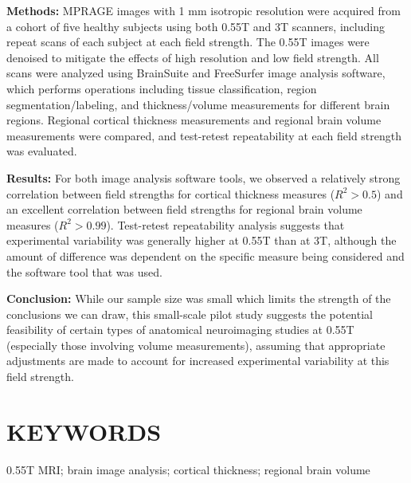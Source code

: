 \documentclass[12pt,letterpaper,onecolumn]{article}
\begin{document}
\noindent \textbf{Methods:} MPRAGE images with 1 mm isotropic resolution were acquired from a cohort of five healthy subjects using both 0.55T and 3T scanners, including repeat scans of each subject at each field strength.  The 0.55T images were denoised to mitigate the effects of high resolution and low field strength.  All scans were analyzed using BrainSuite and FreeSurfer image analysis software, which performs operations including tissue classification, region segmentation/labeling, and thickness/volume measurements for different brain regions. Regional cortical thickness measurements and regional brain volume measurements were compared, and test-retest repeatability at each field strength was evaluated.

\noindent \textbf{Results:} For both image analysis software tools, we observed a 
 relatively strong correlation between field strengths for cortical thickness measures ($R^2 > 0.5$) and an excellent correlation between field strengths for regional brain volume measures ($R^2 > 0.99$).   Test-retest repeatability analysis suggests that experimental variability was generally higher at 0.55T than at 3T, although the amount of difference was dependent on the specific measure being considered and the software tool that was used.

\noindent \textbf{Conclusion:} 
 While our sample size was small which limits the strength of the conclusions we can draw, this {\color{.} small-scale pilot} study suggests the potential feasibility of certain types of anatomical neuroimaging studies at 0.55T (especially those involving volume measurements), assuming that appropriate adjustments are made to account for increased experimental variability at this field strength.


\section*{KEYWORDS}
{0.55T MRI; brain image analysis; cortical thickness; regional brain volume}



\clearpage

 
\end{document}
